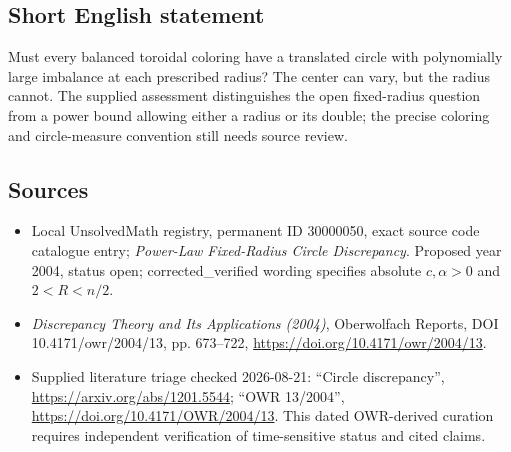 \documentclass[11pt]{article}
\begin{document}
\subsection{Short English statement}
Must every balanced toroidal coloring have a translated circle with polynomially large imbalance at each prescribed radius? The center can vary, but the radius cannot. The supplied assessment distinguishes the open fixed-radius question from a power bound allowing either a radius or its double; the precise coloring and circle-measure convention still needs source review.
\subsection{Sources}
\begin{itemize}
\item Local UnsolvedMath registry, permanent ID 30000050, exact source code catalogue entry; \emph{Power-Law Fixed-Radius Circle Discrepancy}. Proposed year 2004, status open; corrected\_verified wording specifies absolute $c,\alpha>0$ and $2<R<n/2$.
\item \emph{Discrepancy Theory and Its Applications (2004)}, Oberwolfach Reports, DOI 10.4171/owr/2004/13, pp. 673--722, \url{https://doi.org/10.4171/owr/2004/13}.
\item Supplied literature triage checked 2026-08-21: ``Circle discrepancy'', \url{https://arxiv.org/abs/1201.5544}; ``OWR 13/2004'', \url{https://doi.org/10.4171/OWR/2004/13}. This dated OWR-derived curation requires independent verification of time-sensitive status and cited claims.
\end{itemize}
\end{document}
